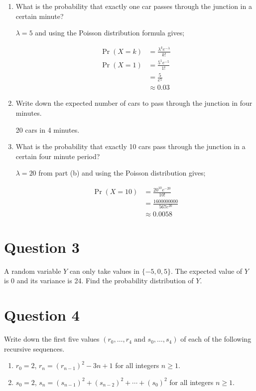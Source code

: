 \documentclass[11pt]{article}
\begin{document}
\begin{enumerate}[label= (\alph*)]
  \item What is the probability that exactly one car passes through the
    junction in a certain minute?

  $\lambda = 5$ and using the Poisson distribution formula gives;

  \begin{align*}
    \Pr(X=k) &= \frac{{\lambda}^k {e}^{- \lambda}}{k!} \\
    \Pr(X=1) &= \frac{5^1 e^{-5}}{1!} \\
    &= \frac{5}{e^5} \\
    &\approx 0.03
  \end{align*}

  \item Write down the expected number of cars to pass through the junction in
    four minutes.

    20 cars in 4 minutes.

  \item What is the probability that exactly 10 cars pass through the junction
    in a certain four minute period?

    $\lambda = 20$ from part (b) and using the Poisson distribution gives;

    \begin{align*}
      \Pr(X=10) &= \frac{20^{10} e^{-20}}{10!} \\
      &= \frac{1600000000}{567 e^{20}} \\
      &\approx 0.0058
    \end{align*}
\end{enumerate}

\break{}
\section*{Question 3}

A random variable $Y$ can only take values in $ \{ -5, 0, 5 \}$. The expected
value of $Y$ is 0 and its variance is 24. Find the probability distribution of
$Y$.

\section*{Question 4}

Write down the first five values $(r_0, \dots, r_4 \text{ and } s_0, \dots,
s_4)$ of each of the following recursive sequences.

\begin{enumerate}[label = (\alph*)]
  \item $r_0 = 2$, $r_n = {(r_{n-1})}^2 - 3n + 1$ for all integers $n \geq 1$.

  \item $s_0 = 2$, $s_n = {(s_{n-1})}^2 + {(s_{n-2})}^2 + \cdots + {(s_0)}^2$
  for all integers $n \geq 1$.

\end{enumerate}
\end{document}
